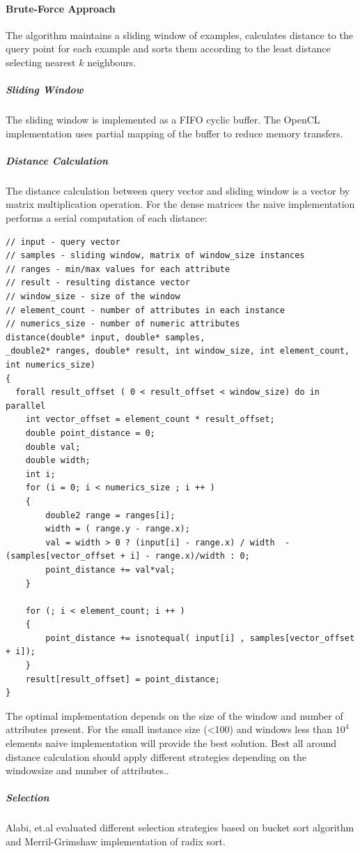 \documentclass[]{report}
\begin{document}
\paragraph*{Brute-Force Approach}
The algorithm maintains a sliding window of examples, calculates distance to the query point for each example and sorts them according to the least distance selecting nearest $k$ neighbours.
\subparagraph*{Sliding Window}
The sliding window is implemented as a FIFO cyclic buffer.
The OpenCL implementation uses partial mapping of the buffer to reduce memory transfers.
\subparagraph*{Distance Calculation}
The distance calculation between query vector and sliding window is a vector by matrix multiplication operation. 
For the dense matrices the naive implementation performs a serial computation of each distance:
\begin{lstlisting}
// input - query vector
// samples - sliding window, matrix of window_size instances
// ranges - min/max values for each attribute
// result - resulting distance vector
// window_size - size of the window
// element_count - number of attributes in each instance
// numerics_size - number of numeric attributes
distance(double* input, double* samples,						_double2* ranges, double* result, int window_size, int element_count, int numerics_size)
{
  forall result_offset ( 0 < result_offset < window_size) do in parallel
    int vector_offset = element_count * result_offset;
	double point_distance = 0;
	double val;
	double width;
	int i;
	for (i = 0; i < numerics_size ; i ++ ) 
	{
		double2 range = ranges[i];
		width = ( range.y - range.x);
		val = width > 0 ? (input[i] - range.x) / width  - (samples[vector_offset + i] - range.x)/width : 0;
		point_distance += val*val; 
	}
	
	for (; i < element_count; i ++ ) 
	{
		point_distance += isnotequal( input[i] , samples[vector_offset + i]);
	}
	result[result_offset] = point_distance;
}
\end{lstlisting}
The optimal implementation depends on the size of the window and number of attributes present\cite{Sorensen2011}. For the small instance size (<100) and windows less than $ 10^{4} $ elements naive implementation will provide the best solution. Best all around distance calculation should apply different strategies depending on the windowsize and number of attributes.\cite{Sorensen2011}.

\subparagraph*{Selection}

Alabi, et.al evaluated different selection strategies based on bucket sort algorithm and Merril-Grimshaw implementation of radix sort\cite{Alabi2012}.  
\end{document}
